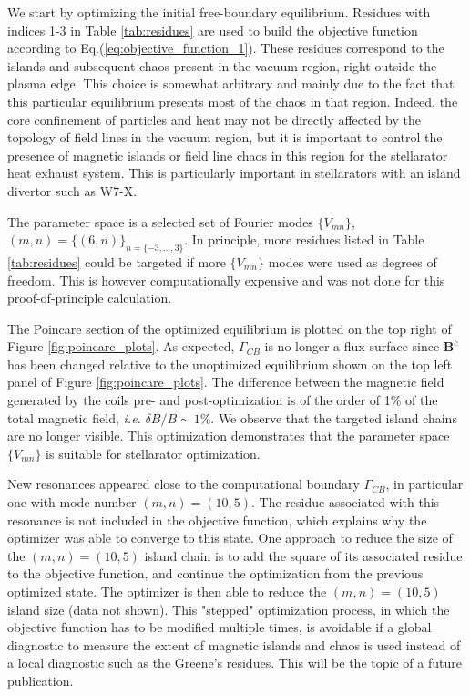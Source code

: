 \documentclass[my_thesis.tex]{subfiles}
\begin{document}
We start by optimizing the initial free-boundary equilibrium. Residues with indices 1-3 in Table \ref{tab:residues} are used to build the objective function according to Eq.(\ref{eq:objective_function_1}). These residues correspond to the islands and subsequent chaos present in the vacuum region, right outside the plasma edge. This choice is somewhat arbitrary and mainly due to the fact that this particular equilibrium presents most of the chaos in that region. Indeed, the core confinement of particles and heat may not be directly affected by the topology of field lines in the vacuum region, but it is important to control the presence of magnetic islands or field line chaos in this region for the stellarator heat exhaust system. This is particularly important in stellarators with an island divertor such as W7-X\cite{Geiger2015}.

The parameter space is a selected set of Fourier modes $\{V_{mn}\}$,  $(m,n)=\{(6,n)\}_{n=\{-3,\ldots,3\}}$. In principle, more residues listed in Table \ref{tab:residues} could be targeted if more $\{V_{mn}\}$ modes were used as degrees of freedom. This is however computationally expensive and was not done for this proof-of-principle calculation.

The Poincare section of the optimized equilibrium is plotted on the top right of Figure \ref{fig:poincare_plots}. As expected, $\Gamma_{CB}$ is no longer a flux surface since $\mathbf{B}^c$ has been changed relative to the unoptimized equilibrium shown on the top left panel of Figure \ref{fig:poincare_plots}. The difference between the magnetic field generated by the coils pre- and post-optimization is of the order of 1\% of the total magnetic field, \textit{i.e.} $\delta B/B \sim 1\%$. We observe that the targeted island chains are no longer visible. This optimization demonstrates that the parameter space $\{V_{mn}\}$ is suitable for stellarator optimization.

New resonances appeared close to the computational boundary $\Gamma_{CB}$, in particular one with mode number $(m,n)=(10,5)$. The residue associated with this resonance is not included in the objective function, which explains why the optimizer was able to converge to this state. One approach to reduce the size of the $(m,n)=(10,5)$ island chain is to add the square of its associated residue to the objective function, and continue the optimization from the previous optimized state. The optimizer is then able to reduce the $(m,n)=(10,5)$ island size (data not shown). This "stepped" optimization process, in which the objective function has to be modified multiple times, is avoidable if a global diagnostic to measure the extent of magnetic islands and chaos is used instead of a local diagnostic such as the Greene's residues. This will be the topic of a future publication.
\end{document}
